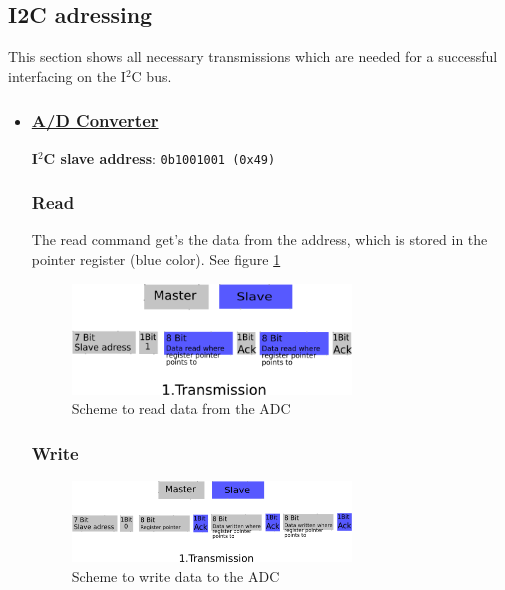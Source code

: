 \subsection{I2C adressing}
\label{sec:hardware:Components:Adressing}

This section shows all necessary transmissions which are needed for a successful interfacing on the I$^2$C bus. 

\begin{itemize}
	\item \subsubsection{\underline{\textbf{A/D Converter}}}
\label{sec:hardware:Components:Adressing:ADC}

\textbf{I$^2$C slave address}: \texttt{0b1001001 (0x49)}

\subsubsection{Read}
\label{subsec:ADCread}

The read command get's the data from the address, which is stored in the pointer register (blue color). See figure \ref{fig:ADC1}

\begin{figure}[H]
	\centering\includegraphics[width=0.7\textwidth]{fig/I2C_Adressing/ADC_read}
	\caption{Scheme to read data from the ADC}
	\label{fig:ADC1}
\end{figure}

\subsubsection{Write}
\label{subsec:ADCwrite}


\begin{figure}[H]
	\centering\includegraphics[width=0.7\textwidth]{fig/I2C_Adressing/ADC_write}
	\caption{Scheme to write data to the ADC}
	\label{fig:ADC2}
\end{figure}


\end{itemize}

